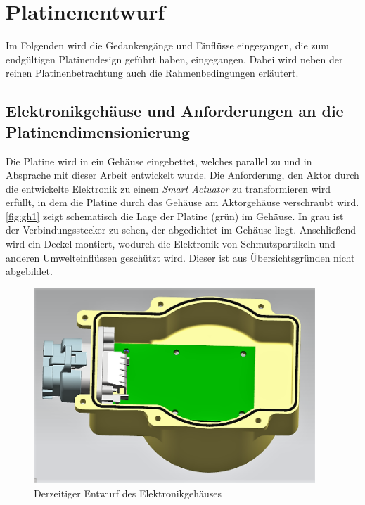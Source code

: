 \chapter{Platinenentwurf}\label{kap5}
Im Folgenden wird die Gedankengänge und Einflüsse eingegangen, die zum endgültigen Platinendesign geführt haben, eingegangen. Dabei wird neben der reinen Platinenbetrachtung auch die Rahmenbedingungen erläutert.
\section{Elektronikgehäuse und Anforderungen an die Platinendimensionierung}
Die Platine wird in ein Gehäuse eingebettet, welches parallel zu und in Absprache mit dieser Arbeit entwickelt wurde. Die Anforderung, den Aktor durch die entwickelte Elektronik zu einem \textit{Smart Actuator} zu transformieren wird erfüllt, in
dem die Platine durch das Gehäuse am Aktorgehäuse verschraubt wird. \autoref{fig:gh1} zeigt schematisch die Lage der Platine (grün) im Gehäuse. In grau ist der Verbindungsstecker zu sehen, der abgedichtet im Gehäuse liegt. Anschließend wird ein Deckel montiert, wodurch die Elektronik von Schmutzpartikeln und anderen Umwelteinflüssen geschützt wird. Dieser ist aus Übersichtsgründen nicht abgebildet.

\begin{figure}[H]%
\centering
\includegraphics[width=300pt]{./Bilder/Elektronik_Gehauese_ver3}%
\caption{Derzeitiger Entwurf des Elektronikgehäuses}%
\label{fig:gh1}%
\end{figure}\noindent

